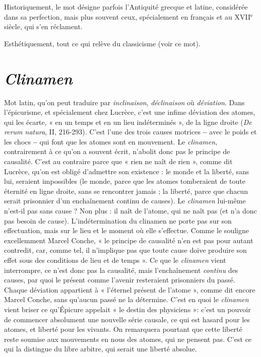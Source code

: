 Historiquement, le mot désigne parfois l’Antiquité grecque et latine, considérée
dans sa perfection, mais plus souvent ceux, spécialement en français et au
{\footnotesize XVII$^\text{e}$} siècle, qui s’en réclament.

Esthétiquement, tout ce qui relève du classicisme (voir ce mot).

\section{\it Clinamen}
Mot latin, qu’on peut traduire par {\it inclinaison}, {\it déclinaison} où
{\it déviation}. Dans l’épicurisme, et spécialement chez Lucrèce,
c’est une infime déviation des atomes, qui les écarte, « en un temps et en un
lieu indéterminés », de la ligne droite ({\it De rerum natura}, II, 216-293). C’est
l'une des trois causes motrices {\bf --} avec le poids et les chocs {\bf --} qui font que les
atomes sont en mouvement. Le {\it clinamen}, contrairement à ce qu’on a souvent
écrit, n’abolit donc pas le principe de causalité. C’est au contraire parce que
« rien ne naît de rien », comme dit Lucrèce, qu’on est obligé d'admettre son
existence : le monde et la liberté, sans lui, seraient impossibles (le monde, parce
que les atomes tomberaient de toute éternité en ligne droite, sans se rencontrer
jamais ; la liberté, parce que chacun serait prisonnier d’un enchaînement
continu de causes). Le {\it clinamen} lui-même n'est-il pas sans cause ? Non plus : il
naît de l'atome, qui ne naît pas (et n’a donc pas besoin de cause). L’indétermination
du clinamen ne porte pas sur son effectuation, mais sur le lieu et le
moment où elle s’effectue. Comme le souligne excellemment Marcel Conche,
« le principe de causalité n’en est pas pour autant contredit, car, comme tel, il
n'implique pas que toute cause doive produire son effet sous des conditions de
lieu et de temps ». Ce que le {\it clinamen} vient interrompre, ce n’est donc pas la
causalité, mais l’enchaînement {\it continu} des causes, par quoi le présent comme
l'avenir resteraient prisonniers du passé. Chaque déviation appartient à
« l'éternel présent de l'atome », comme dit encore Marcel Conche, sans
qu'aucun passé ne la détermine. C’est en quoi le {\it clinamen} vient briser ce
qu’Épicure appelait « le destin des physiciens »: c’est un pouvoir de commencer
absolument une nouvelle série causale, ce qui est hasard pour les
atomes, et liberté pour les vivants. On remarquera pourtant que cette liberté
reste soumise aux mouvements en nous des atomes, qui ne pensent pas. C’est
ce qui la distingue du libre arbitre, qui serait une liberté absolue.

